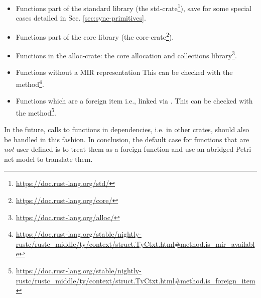 \begin{itemize}
    \item Functions part of the standard library (the std-crate\footnote{\url{https://doc.rust-lang.org/std/}}),
          save for some special cases detailed in Sec. \ref{sec:sync-primitives}.
    \item Functions part of the core library (the core-crate\footnote{\url{https://doc.rust-lang.org/core/}}).
    \item Functions in the alloc-crate: the core allocation and collections library\footnote{\url{https://doc.rust-lang.org/alloc/}}.
    \item Functions without a \acrshort{MIR} representation
          This can be checked with the 
          method\footnote{\url{https://doc.rust-lang.org/stable/nightly-rustc/rustc_middle/ty/context/struct.TyCtxt.html\#method.is\_mir\_available}}.
    \item Functions which are a foreign item i.e., linked via .
          This can be checked with the 
          method\footnote{\url{https://doc.rust-lang.org/stable/nightly-rustc/rustc_middle/ty/context/struct.TyCtxt.html\#method.is\_foreign\_item}}.
\end{itemize}

In the future, calls to functions in dependencies, i.e. in other crates, should also be handled in this fashion.
In conclusion, the default case for functions that are \emph{not} user-defined
is to treat them as a foreign function and use an abridged Petri net model to translate them.